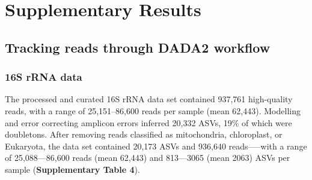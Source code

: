 \documentclass[
  10pt,
  letterpaper,
  DIV=11,
  numbers=noendperiod]{scrartcl}
\begin{document}
\hypertarget{supplementary-results}{%
\section{Supplementary Results}\label{supplementary-results}}

\hypertarget{tracking-reads-through-dada2-workflow}{%
\subsection{Tracking reads through DADA2
workflow}\label{tracking-reads-through-dada2-workflow}}

\hypertarget{s-rrna-data}{%
\subsubsection{16S rRNA data}\label{s-rrna-data}}

The processed and curated 16S rRNA data set contained 937,761
high-quality reads, with a range of 25,151--86,600 reads per sample
(mean 62,443). Modelling and error correcting amplicon errors inferred
20,332 ASVs, 19\% of which were doubletons. After removing reads
classified as mitochondria, chloroplast, or Eukaryota, the data set
contained 20,173 ASVs and 936,640 reads-----with a range of
25,088---86,600 reads (mean 62,443) and 813---3065 (mean 2063) ASVs per
sample (\textbf{Supplementary Table 4}).
\end{document}
